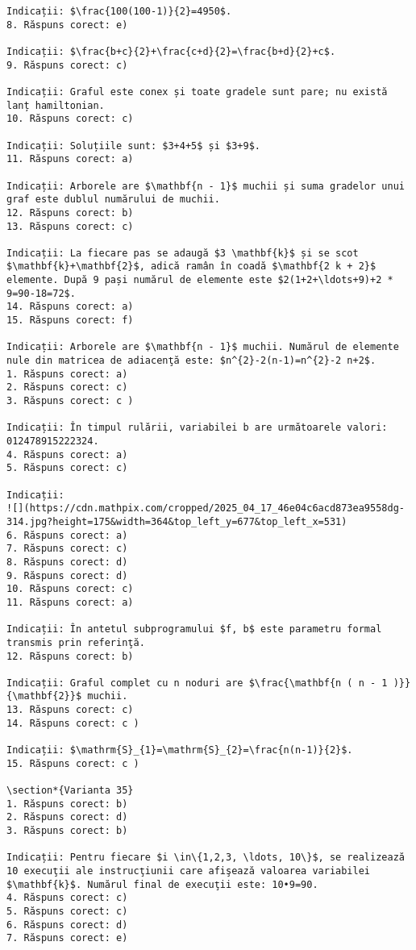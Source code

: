 \begin{verbatim}
Indicații: $\frac{100(100-1)}{2}=4950$.
8. Răspuns corect: e)

Indicații: $\frac{b+c}{2}+\frac{c+d}{2}=\frac{b+d}{2}+c$.
9. Răspuns corect: c)

Indicații: Graful este conex și toate gradele sunt pare; nu există lanț hamiltonian.
10. Răspuns corect: c)

Indicații: Soluțiile sunt: $3+4+5$ și $3+9$.
11. Răspuns corect: a)

Indicații: Arborele are $\mathbf{n - 1}$ muchii și suma gradelor unui graf este dublul numărului de muchii.
12. Răspuns corect: b)
13. Răspuns corect: c)

Indicații: La fiecare pas se adaugă $3 \mathbf{k}$ și se scot $\mathbf{k}+\mathbf{2}$, adică ramân în coadă $\mathbf{2 k + 2}$ elemente. După 9 pași numărul de elemente este $2(1+2+\ldots+9)+2 * 9=90-18=72$.
14. Răspuns corect: a)
15. Răspuns corect: f)

Indicații: Arborele are $\mathbf{n - 1}$ muchii. Numărul de elemente nule din matricea de adiacenţă este: $n^{2}-2(n-1)=n^{2}-2 n+2$.
1. Răspuns corect: a)
2. Răspuns corect: c)
3. Răspuns corect: c )

Indicații: În timpul rulării, variabilei b are următoarele valori:
012478915222324.
4. Răspuns corect: a)
5. Răspuns corect: c)

Indicații:
![](https://cdn.mathpix.com/cropped/2025_04_17_46e04c6acd873ea9558dg-314.jpg?height=175&width=364&top_left_y=677&top_left_x=531)
6. Răspuns corect: a)
7. Răspuns corect: c)
8. Răspuns corect: d)
9. Răspuns corect: d)
10. Răspuns corect: c)
11. Răspuns corect: a)

Indicații: În antetul subprogramului $f, b$ este parametru formal transmis prin referinţă.
12. Răspuns corect: b)

Indicații: Graful complet cu n noduri are $\frac{\mathbf{n ( n - 1 )}}{\mathbf{2}}$ muchii.
13. Răspuns corect: c)
14. Răspuns corect: c )

Indicații: $\mathrm{S}_{1}=\mathrm{S}_{2}=\frac{n(n-1)}{2}$.
15. Răspuns corect: c )

\section*{Varianta 35}
1. Răspuns corect: b)
2. Răspuns corect: d)
3. Răspuns corect: b)

Indicații: Pentru fiecare $i \in\{1,2,3, \ldots, 10\}$, se realizează 10 execuţii ale instrucţiunii care afişează valoarea variabilei $\mathbf{k}$. Numărul final de execuţii este: 10•9=90.
4. Răspuns corect: c)
5. Răspuns corect: c)
6. Răspuns corect: d)
7. Răspuns corect: e)


\end{verbatim}

